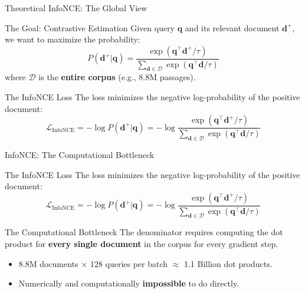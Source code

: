 \documentclass[aspectratio=169]{beamer}
\newif\ifanimated
\newcommand{\cpause}{\ifanimated\pause\fi}
\newcommand{\vq}{\mathbf{q}}
\newcommand{\vd}{\mathbf{d}}
\begin{document}
\begin{frame}{Theoretical InfoNCE: The Global View}
\begin{block}{The Goal: Contrastive Estimation}
Given query $\vq$ and its relevant document $\vd^+$, we want to maximize the probability:
$$P(\vd^+ | \vq) = \frac{\exp(\vq^\top \vd^+ / \tau)}{\sum_{\vd \in \mathcal{D}} \exp(\vq^\top \vd / \tau)}$$
where $\mathcal{D}$ is the \textbf{entire corpus} (e.g., 8.8M passages).
\end{block}

\cpause

\begin{block}{The InfoNCE Loss}
The loss minimizes the negative log-probability of the positive document:
$$\mathcal{L}_{\text{InfoNCE}} = -\log P(\vd^+ | \vq) = -\log \frac{\exp(\vq^\top \vd^+ / \tau)}{\sum_{\vd \in \mathcal{D}} \exp(\vq^\top \vd / \tau)}$$
\end{block}

\cpause
\vspace{0.5em}

\end{frame}


\begin{frame}{InfoNCE: The Computational Bottleneck}

\begin{block}{The InfoNCE Loss}
The loss minimizes the negative log-probability of the positive document:
$$\mathcal{L}_{\text{InfoNCE}} = -\log P(\vd^+ | \vq) = -\log \frac{\exp(\vq^\top \vd^+ / \tau)}{\sum_{\vd \in \mathcal{D}} \exp(\vq^\top \vd / \tau)}$$
\end{block}

\cpause
\vspace{0.5em}

\begin{alertblock}{The Computational Bottleneck}
The denominator requires computing the dot product for \textbf{every single document} in the corpus for every gradient step. 
\begin{itemize}
    \item 8.8M documents $\times$ 128 queries per batch $\approx$ 1.1 Billion dot products.
    \item Numerically and computationally \textbf{impossible} to do directly.
\end{itemize}
\end{alertblock}
\end{frame}
\end{document}
